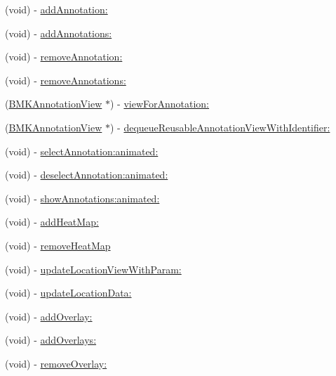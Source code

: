 \begin{DoxyCompactItemize}
\item 
(void) -\/ \hyperlink{interface_b_m_k_map_view_a2af9ed45c3a7fd530dd414dc573327b3}{add\+Annotation\+:}
\item 
(void) -\/ \hyperlink{interface_b_m_k_map_view_affd032313c55ae27814430b760e4aea0}{add\+Annotations\+:}
\item 
(void) -\/ \hyperlink{interface_b_m_k_map_view_a6b6b75a5bf8b02854767f782a38d2009}{remove\+Annotation\+:}
\item 
(void) -\/ \hyperlink{interface_b_m_k_map_view_a37fbe2b5db750affb4e0234cbf24a3c7}{remove\+Annotations\+:}
\item 
(\hyperlink{interface_b_m_k_annotation_view}{B\+M\+K\+Annotation\+View} $\ast$) -\/ \hyperlink{interface_b_m_k_map_view_a0fb885234188aef28df944d5f636c70c}{view\+For\+Annotation\+:}
\item 
(\hyperlink{interface_b_m_k_annotation_view}{B\+M\+K\+Annotation\+View} $\ast$) -\/ \hyperlink{interface_b_m_k_map_view_a4d4aa7a171876f3f66add8f86cca1e8c}{dequeue\+Reusable\+Annotation\+View\+With\+Identifier\+:}
\item 
(void) -\/ \hyperlink{interface_b_m_k_map_view_a92dbf00c3eff2ede4d4ffd485c4059e0}{select\+Annotation\+:animated\+:}
\item 
(void) -\/ \hyperlink{interface_b_m_k_map_view_a3d6bbc91bc3b66463ee97b3c909e4999}{deselect\+Annotation\+:animated\+:}
\item 
(void) -\/ \hyperlink{interface_b_m_k_map_view_a62093e51bd52b357d909b75b4447b415}{show\+Annotations\+:animated\+:}
\item 
(void) -\/ \hyperlink{interface_b_m_k_map_view_a5945dec15b2d38ecf4b8efd4ce6b49e2}{add\+Heat\+Map\+:}
\item 
(void) -\/ \hyperlink{interface_b_m_k_map_view_a1337cb03abdb9ae730a2410f0fbd2f2f}{remove\+Heat\+Map}
\item 
(void) -\/ \hyperlink{interface_b_m_k_map_view_afc9842b45a41341b3ea5d2e632344382}{update\+Location\+View\+With\+Param\+:}
\item 
(void) -\/ \hyperlink{interface_b_m_k_map_view_a72c1c3b690379ecf804cc20ddf5840e9}{update\+Location\+Data\+:}
\item 
(void) -\/ \hyperlink{interface_b_m_k_map_view_af85ad6091568df29d9e7c3dea82a1a2b}{add\+Overlay\+:}
\item 
(void) -\/ \hyperlink{interface_b_m_k_map_view_ab7d29d948515cc6d947d6aa63f904168}{add\+Overlays\+:}
\item 
(void) -\/ \hyperlink{interface_b_m_k_map_view_a3be1f2a019df3ff971f6a36f142e55be}{remove\+Overlay\+:}

\end{DoxyCompactItemize}
